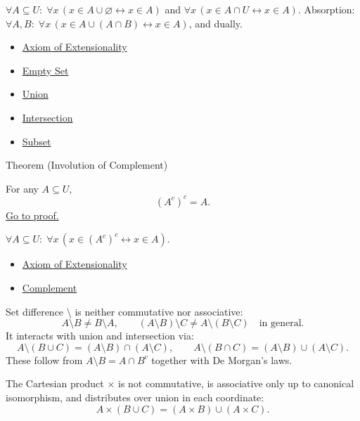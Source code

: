 \begin{remark*}
$\forall A \subseteq U:\; \forall x\,(x \in A \cup \varnothing \leftrightarrow x \in A)$ and $\forall x\,(x \in A \cap U \leftrightarrow x \in A)$.
Absorption: $\forall A, B:\; \forall x\,(x \in A \cup (A \cap B) \leftrightarrow x \in A)$, and dually.
\end{remark*}

\begin{dependencies}
\begin{itemize}
  \item \hyperref[ax:extensionality]{Axiom of Extensionality}
  \item \hyperref[def:empty-set]{Empty Set}
  \item \hyperref[def:union]{Union}
  \item \hyperref[def:intersection]{Intersection}
  \item \hyperref[def:subset]{Subset}
\end{itemize}
\end{dependencies}

\begin{theorembox}{Theorem (Involution of Complement)}
\begin{theorem}\label{thm:involution}
For any $A \subseteq U$,
\[
(A^c)^c = A.
\]
\hyperref[prf:involution]{Go to proof.}
\end{theorem}
\end{theorembox}

\begin{remark*}
$\forall A \subseteq U:\; \forall x\,(x \in (A^c)^c \leftrightarrow x \in A)$.
\end{remark*}

\begin{dependencies}
\begin{itemize}
  \item \hyperref[ax:extensionality]{Axiom of Extensionality}
  \item \hyperref[def:complement]{Complement}
\end{itemize}
\end{dependencies}

\begin{remark*}
Set difference $\setminus$ is neither commutative nor associative:
\[
A \setminus B \neq B \setminus A,
\qquad
(A \setminus B) \setminus C \neq A \setminus (B \setminus C) \quad \text{in general}.
\]
It interacts with union and intersection via:
\[
A \setminus (B \cup C) = (A \setminus B) \cap (A \setminus C),
\qquad
A \setminus (B \cap C) = (A \setminus B) \cup (A \setminus C).
\]
These follow from $A \setminus B = A \cap B^c$ together with De Morgan's laws.
\end{remark*}

\begin{remark*}
The Cartesian product $\times$ is not commutative, is associative only up to
canonical isomorphism, and distributes over union in each coordinate:
\[
A \times (B \cup C) = (A \times B) \cup (A \times C).
\]
\end{remark*}
